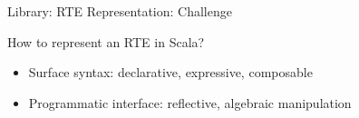 {  
\begin{frame}{Library: }{RTE Representation: Challenge }

  How to represent an RTE in Scala?


  \medskip
  
  \begin{itemize}
  \item Surface syntax: declarative, expressive, composable
  \item Programmatic interface: reflective, algebraic manipulation
  \end{itemize}
\end{frame}
}

